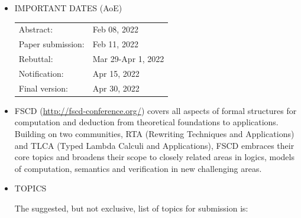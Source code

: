 \documentclass[prodmode,acmtecs]{acmsmall} %
\begin{document}
\begin{itemize}\item  IMPORTANT DATES (AoE) 
 
\begin{tabulary}{\linewidth}{LL}Abstract:  & Feb 08, 2022 \\
Paper submission:  & Feb 11, 2022 \\
Rebuttal:  & Mar 29-Apr 1, 2022 \\
Notification:  & Apr 15, 2022 \\
Final version:  & Apr 30, 2022 \\
\end{tabulary}
 
\item  FSCD (\href{http://fscd-conference.org/}{http://fscd-conference.org/}) covers all aspects of formal structures for computation and deduction from theoretical foundations to applications. Building on two communities, RTA (Rewriting Techniques and Applications) and TLCA (Typed Lambda Calculi and Applications), FSCD embraces their core topics and broadens their scope to closely related areas in logics, models of computation, semantics and verification in new challenging areas. 
 
\item  TOPICS  
 
  The suggested, but not exclusive, list of topics for submission is: 
 

\end{itemize}
\end{document}
